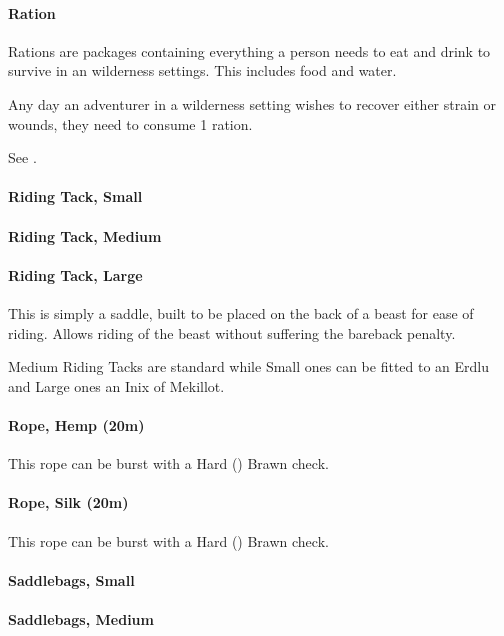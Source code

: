 \begin{multicols}{2}
\paragraph{Ration} \label{advitm:ration}
Rations are packages containing everything a person needs
to eat and drink to survive in an wilderness settings.
This includes food and water.

Any day an adventurer in a wilderness setting wishes
to recover either strain or wounds, they need to consume
1 ration.

See .

\paragraph{Riding Tack, Small} \label{advitm:riding-tack-small}
\paragraph{Riding Tack, Medium} \label{advitm:riding-tack-medium}
\paragraph{Riding Tack, Large} \label{advitm:riding-tack-large}
This is simply a saddle, built to be placed on the back
of a beast for ease of riding.
Allows riding of the beast without suffering the bareback penalty.

Medium Riding Tacks are standard while Small ones can be fitted to an Erdlu and Large ones an Inix of Mekillot.

\paragraph{Rope, Hemp (20m)} \label{advitm:rope_hemp}
This rope can be burst with a Hard (\difficulty\difficulty\difficulty)
Brawn check.

\paragraph{Rope, Silk (20m)} \label{advitm:rope_silk}
This rope can be burst with a Hard (\difficulty\difficulty\difficulty\setback)
Brawn check.

\paragraph{Saddlebags, Small} \label{advitm:saddlebags-small}
\paragraph{Saddlebags, Medium} \label{advitm:saddlebags-medium}

\end{multicols}
